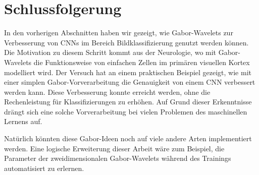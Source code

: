 \section{Schlussfolgerung}

In den vorherigen Abschnitten haben wir gezeigt, wie Gabor-Wavelets zur Verbesserung von CNNs im Bereich Bildklassifizierung genutzt werden können.
Die Motivation zu diesem Schritt kommt aus der Neurologie, wo mit Gabor-Wavelets die Funktionsweise von einfachen Zellen im primären visuellen Kortex modelliert wird.
Der Versuch hat an einem praktischen Beispiel gezeigt, wie mit einer simplen Gabor-Vorverarbeitung die Genauigkeit von einem CNN verbessert werden kann.
Diese Verbesserung konnte erreicht werden, ohne die Rechenleistung für Klassifizierungen zu erhöhen.
Auf Grund dieser Erkenntnisse drängt sich eine solche Vorverarbeitung bei vielen Problemen des maschinellen Lernens auf. 

Natürlich könnten diese Gabor-Ideen noch auf viele andere Arten implementiert werden.
Eine logische Erweiterung dieser Arbeit wäre zum Beispiel, die Parameter der zweidimensionalen Gabor-Wavelets während des Trainings automatisiert zu erlernen.
